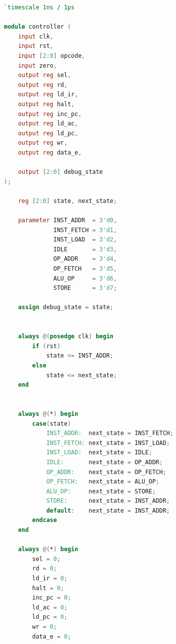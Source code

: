 \begin{lstlisting}[language=Verilog, caption={Controller}]
`timescale 1ns / 1ps

module controller (
    input clk,
    input rst,              
    input [2:0] opcode,
    input zero,
    output reg sel,
    output reg rd,
    output reg ld_ir,
    output reg halt,
    output reg inc_pc,
    output reg ld_ac,
    output reg ld_pc,
    output reg wr,
    output reg data_e,

    output [2:0] debug_state
);

    reg [2:0] state, next_state;

    parameter INST_ADDR  = 3'd0,
              INST_FETCH = 3'd1,
              INST_LOAD  = 3'd2,
              IDLE       = 3'd3,
              OP_ADDR    = 3'd4,
              OP_FETCH   = 3'd5,
              ALU_OP     = 3'd6,
              STORE      = 3'd7;

    assign debug_state = state;


    always @(posedge clk) begin
        if (rst)
            state <= INST_ADDR;
        else
            state <= next_state;
    end


    always @(*) begin
        case(state)
            INST_ADDR:  next_state = INST_FETCH;
            INST_FETCH: next_state = INST_LOAD;
            INST_LOAD:  next_state = IDLE;
            IDLE:       next_state = OP_ADDR;
            OP_ADDR:    next_state = OP_FETCH;
            OP_FETCH:   next_state = ALU_OP;
            ALU_OP:     next_state = STORE;
            STORE:      next_state = INST_ADDR;
            default:    next_state = INST_ADDR;
        endcase
    end

    always @(*) begin
        sel = 0;
        rd = 0;
        ld_ir = 0;
        halt = 0;
        inc_pc = 0;
        ld_ac = 0;
        ld_pc = 0;
        wr = 0;
        data_e = 0;


\end{lstlisting}
